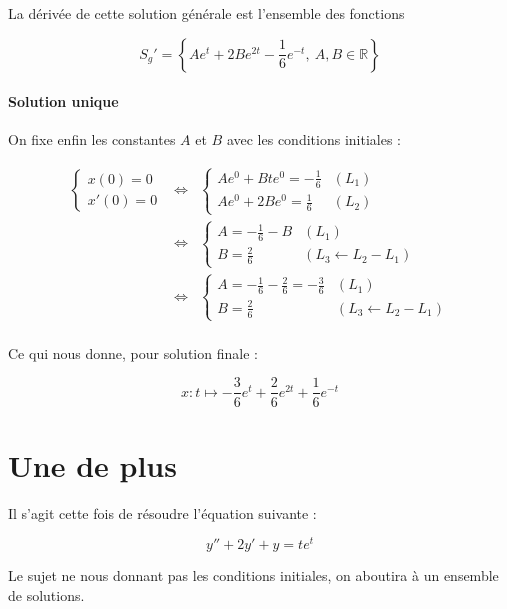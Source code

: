 \documentclass[a4paper, 11pt]{report} %
\newcommand{\R}{\mathbb{R}}
\renewcommand{\mapsto}{\longmapsto}
\begin{document}
La dérivée de cette solution générale est l'ensemble des fonctions

\[
S_g' = \left\{Ae^{t} + 2Be^{2t} - \frac{1}{6}e^{-t},~A,B\in\R\right\}
\]

\paragraph{Solution unique}
On fixe enfin les constantes $A$ et $B$ avec les conditions initiales :

\begin{eqnarray*}
\left\{\begin{array}{l}
x(0) = 0\\
x'(0) = 0
\end{array}\right. & \Leftrightarrow &
\left\{\begin{array}{ll}
Ae^0 + Bte^0 = - \frac{1}{6} & (L_1)\\
Ae^0 + 2Be^0 = \frac{1}{6} & (L_2)
\end{array}\right.\\
& \Leftrightarrow &                     %
\left\{\begin{array}{ll}
A = -\frac{1}{6} - B & (L_1)\\
B = \frac{2}{6} & (L_3 \leftarrow L_2 - L_1)
\end{array}\right.\\
& \Leftrightarrow &                     %
\left\{\begin{array}{ll}
A = -\frac{1}{6} - \frac{2}{6} = -\frac{3}{6} & (L_1)\\
B = \frac{2}{6} & (L_3 \leftarrow L_2 - L_1)
\end{array}\right.\\
\end{eqnarray*}

Ce qui nous donne, pour solution finale :

\[
x : t \mapsto -\frac{3}{6}e^{t} + \frac{2}{6}e^{2t} + \frac{1}{6}e^{-t}
\]

\section{Une de plus} %

Il s'agit cette fois de résoudre l'équation suivante :

\begin{equation}
y'' +2y' +y = te^t
\label{equa_diff_5}    
\end{equation}

Le sujet ne nous donnant pas les conditions initiales, on aboutira à un ensemble de solutions.
\end{document}
